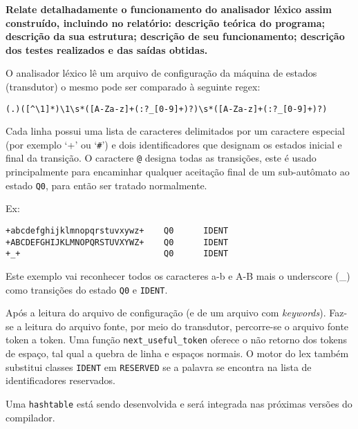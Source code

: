 
\textbf{Relate detalhadamente o funcionamento do analisador léxico assim construído, incluindo no relatório: descrição teórica do programa; descrição da sua estrutura; descrição de seu funcionamento; descrição dos testes realizados e das saídas obtidas.}

O analisador léxico lê um arquivo de configuração da máquina de estados
(transdutor) o mesmo pode ser comparado à seguinte regex:

\verb!(.)([^\1]*)\1\s*([A-Za-z]+(:?_[0-9]+)?)\s*([A-Za-z]+(:?_[0-9]+)?)!

Cada linha possui uma lista de caracteres delimitados por um caractere
especial (por exemplo `+' ou `\verb!#!') e dois identificadores que designam os
estados inicial e final da transição. O caractere \verb!@! designa todas as
transições, este é usado principalmente para encaminhar qualquer aceitação
final de um sub-autômato ao estado \verb!Q0!, para então ser tratado
normalmente.

Ex:
\begin{lstlisting}
+abcdefghijklmnopqrstuvxywz+    Q0      IDENT
+ABCDEFGHIJKLMNOPQRSTUVXYWZ+    Q0      IDENT
+_+                             Q0      IDENT
\end{lstlisting}
Este exemplo vai reconhecer todos os caracteres a-b e A-B mais o underscore
(\_) como transições do estado \verb!Q0! e \verb!IDENT!.

Após a leitura do arquivo de configuração (e de um arquivo com
    \emph{keywords}). Faz-se a leitura do arquivo fonte, por meio do
transdutor, percorre-se o arquivo fonte token a token. Uma função
\verb!next_useful_token! oferece o não retorno dos tokens de espaço, tal qual a
quebra de linha e espaços normais. O motor do lex também substitui classes
\verb!IDENT! em \verb!RESERVED! se a palavra se encontra na lista de
identificadores reservados. 

Uma \verb+hashtable+ está sendo desenvolvida e será integrada nas próximas versões do
compilador. 


